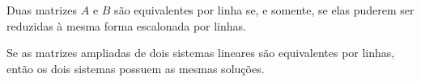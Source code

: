 \documentclass{beamer}
\begin{document}
    \begin{frame}
        \begin{teorema}
            Duas matrizes $A$ e $B$ são equivalentes por linha \pause se, e somente, se elas puderem ser reduzidas à mesma forma escalonada por linhas.
        \end{teorema}
    \end{frame}

    \begin{frame}
        \begin{teorema}
            Se as matrizes ampliadas \pause de dois sistemas lineares são equivalentes por linhas, \pause então os dois sistemas possuem as mesmas soluções.
        \end{teorema}
    \end{frame}
\end{document}
